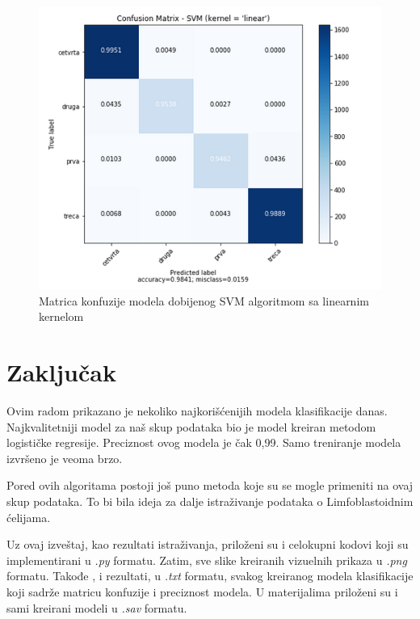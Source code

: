 \documentclass[a4paper]{article}
\begin{document}
\begin{figure}[h!]
\begin{center}
\includegraphics[scale=0.55]{svm_linear.png}
\end{center}
\caption{Matrica konfuzije modela dobijenog SVM algoritmom sa linearnim kernelom}
\label{fig:svm}
\end{figure}


\section{Zaključak}
\label{sec:zakljucak}
Ovim radom prikazano je nekoliko najkorišćenijih modela klasifikacije danas. Najkvalitetniji model za naš skup podataka bio je model kreiran metodom logističke regresije. Preciznost ovog modela je čak 0,99. Samo treniranje modela izvršeno je veoma brzo. 

Pored ovih algoritama postoji još puno metoda koje su se mogle primeniti na ovaj skup podataka. To bi bila ideja za dalje istraživanje podataka o Limfoblastoidnim ćelijama.

Uz ovaj izveštaj, kao rezultati istraživanja, priloženi su i celokupni kodovi koji su implementirani u {\em .py} formatu. Zatim, sve slike kreiranih vizuelnih prikaza u {\em .png} formatu. Takođe , i rezultati, u {\em .txt} formatu, svakog kreiranog modela klasifikacije koji sadrže matricu konfuzije i preciznost modela. U materijalima priloženi su i sami kreirani modeli u {\em .sav} formatu.

\newpage

\appendix
 

\end{document}
